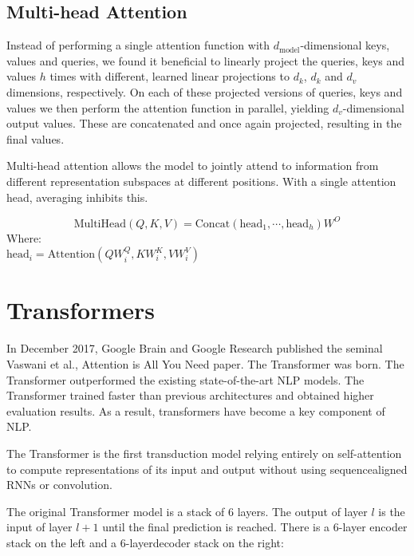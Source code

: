 \documentclass{report}
\begin{document}
\subsection{Multi-head Attention}
Instead of performing a single attention function with $d_\text{model}$-dimensional keys, values and queries, we found it beneficial to linearly project the queries, keys and values $h$ times with different, learned linear projections to $d_k$, $d_k$ and $d_v$ dimensions, respectively. On each of these projected versions of queries, keys and values we then perform the attention function in parallel, yielding $d_v$-dimensional output values. These are concatenated and once again projected, resulting in the final values.

Multi-head attention allows the model to jointly attend to information from different representation subspaces at different positions. With a single attention head, averaging inhibits this.

$$\text{MultiHead}(Q,K,V) = \text{Concat}(\text{head}_1, \cdots, \text{head}_h)W^O$$
Where:\\
$\text{head}_i = \text{Attention}(QW_i^Q, KW_i^K, VW_i^V)$

\section{Transformers} 
 In December 2017, Google Brain and Google Research published the seminal Vaswani et al., Attention is All You Need paper. The Transformer was born. The Transformer outperformed the existing state-of-the-art NLP models. The Transformer trained faster than previous architectures and obtained higher evaluation results. As a result, transformers have become a key component of NLP.
 
The Transformer is the first transduction model relying entirely on self-attention to compute representations of its input and output without using sequencealigned RNNs or convolution.

 The original Transformer model is a stack of 6 layers. The output of layer $l$ is the input of layer $l+1$ until the final prediction is reached. There is a 6-layer encoder stack on the left and a 6-layerdecoder stack on the right:
\end{document}
